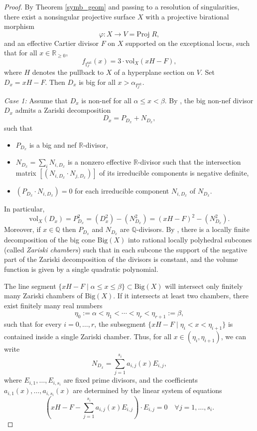 \documentclass[12pt,a4paper]{amsart}
\theoremstyle{plain}
\theoremstyle{definition}
\numberwithin{equation}{theorem}
\begin{document}
\begin{proof}
By Theorem \ref{symb_geom} and passing to a resolution of singularities, there exist a nonsingular projective surface $X$ with a projective birational morphism $$\varphi\colon X \longrightarrow V = \mathrm{Proj}\;R,$$ and an effective Cartier divisor $F$ on $X$ supported on the exceptional locus, such that for all $x\in\mathbb{R}_{\geq 0}$, $$f_{\mathbb{I}^{\mathrm{sat}}_J}(x) = 3\cdot\mathrm{vol}_X(xH-F),$$ where $H$ denotes the pullback to $X$ of a hyperplane section on $V$. Set $D_x =xH-F$. Then $D_x$ is big for all $x>\alpha_{\mathbb{I}^{\mathrm{sat}}_J}$.

\emph{Case 1:} Assume that $D_x$ is non-nef for all $\alpha\leq x<\beta$. By \cite[Theorem 1.1]{BKS04}, the big non-nef divisor $D_x$ admits a Zariski decomposition $$D_x = P_{D_x} + N_{D_x},$$ such that
\begin{itemize}
 \item $P_{D_x}$ is a big and nef $\mathbb{R}$-divisor,
 \item $N_{D_x} = \sum_i N_{i,D_x}$ is a nonzero effective $\mathbb{R}$-divisor such that the intersection matrix $[(N_{i,D_x} \cdot N_{j,D_x})]$ of its irreducible components is negative definite,
 \item $(P_{D_x} \cdot N_{i,D_x}) =0$ for each irreducible component $N_{i,D_x}$ of $N_{D_x}$.
\end{itemize}
In particular, $$\mathrm{vol}_X(D_x)  = P_{D_x}^2 = (D_x^2) - (N_{D_x}^2) = (xH-F)^2 - (N_{D_x}^2).$$ Moreover, if $x\in\mathbb{Q}$ then $P_{D_x}$ and $N_{D_x}$ are $\mathbb{Q}$-divisors. By \cite[Theorem 1.2]{BKS04}, there is a locally finite decomposition of the big cone $\mathrm{Big}(X)$ into rational locally polyhedral subcones (called \emph{Zariski chambers}) such that in each subcone the support of the negative part of the Zariski decomposition of the divisors is constant, and the volume function is given by a single quadratic polynomial.

The line segment $\{xH-F \mid \alpha \leq x\leq \beta\} \subset \mathrm{Big}(X)$ will intersect only finitely many Zariski chambers of $\mathrm{Big}(X)$. If it intersects at least two chambers, there exist finitely many real numbers $$\eta_0:=\alpha<\eta_1<\cdots<\eta_r<\eta_{r+1}:=\beta,$$ such that for every $i=0,\ldots,r$, the subsegment $\{xH-F \mid \eta_i < x<\eta_{i+1}\}$ is contained inside a single Zariski chamber. Thus, for all $x\in(\eta_{i},\eta_{i+1})$, we can write $$N_{D_x} = \sum_{j=1}^{s_i}a_{i,j}(x)E_{i,j},$$ where $E_{i,1},\ldots,E_{i,s_i}$ are fixed prime divisors, and the coefficients $a_{i,1}(x),\ldots,a_{i,s_i}(x)$ are determined by the linear system of equations
$$\left(xH-F - \sum_{j=1}^{s_i}a_{i,j}(x)E_{i,j}\right) \cdot E_{i,j} = 0 \quad \forall j=1,\ldots,s_i.$$


\end{proof}
\end{document}
